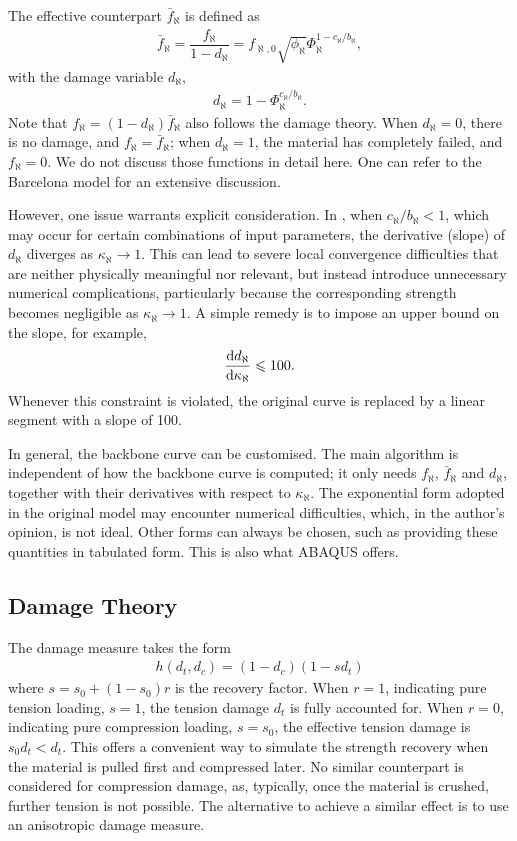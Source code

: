 The effective counterpart $\bar{f}_\aleph$ is defined as
\begin{gather*}
\bar{f}_\aleph=\dfrac{f_\aleph}{1-d_\aleph}=f_{\aleph,0}\sqrt{\phi_\aleph}\Phi_\aleph^{1-c_\aleph/b_\aleph},
\end{gather*}
with the damage variable $d_\aleph$,
\begin{gather}\label{eq:cdp_d_backbone}
d_\aleph=1-\Phi_\aleph^{c_\aleph/b_\aleph}.
\end{gather}
Note that $f_\aleph=\left(1-d_\aleph\right)\bar{f}_\aleph$ also follows the damage theory.
When $d_\aleph=0$, there is no damage, and $f_\aleph=\bar{f}_\aleph$; when $d_\aleph=1$, the material has completely failed, and $f_\aleph=0$.
We do not discuss those functions in detail here.
One can refer to the Barcelona model \cite{Lubliner1989} for an extensive discussion.

However, one issue warrants explicit consideration.
In , when $c_\aleph/b_\aleph<1$, which may occur for certain combinations of input parameters, the derivative (slope) of $d_\aleph$ diverges as $\kappa_\aleph\rightarrow1$.
This can lead to severe local convergence difficulties that are neither physically meaningful nor relevant, but instead introduce unnecessary numerical complications, particularly because the corresponding strength becomes negligible as $\kappa_\aleph\rightarrow1$.
A simple remedy is to impose an upper bound on the slope, for example,
\begin{gather}
    \dfrac{\mathrm{d}d_\aleph}{\mathrm{d}\kappa_\aleph}\leqslant100.
\end{gather}
Whenever this constraint is violated, the original curve is replaced by a linear segment with a slope of \num{100}.

In general, the backbone curve can be customised.
The main algorithm is independent of how the backbone curve is computed; it only needs $f_\aleph$, $\bar{f}_\aleph$ and $d_\aleph$, together with their derivatives with respect to $\kappa_\aleph$.
The exponential form adopted in the original model may encounter numerical difficulties, which, in the author's opinion, is not ideal.
Other forms can always be chosen, such as providing these quantities in tabulated form.
This is also what ABAQUS offers.
\subsection{Damage Theory}
The damage measure takes the form
\begin{gather}
h\left(d_t,d_c\right)=\left(1-d_c\right)\left(1-sd_t\right)
\end{gather}
where $s=s_0+\left(1-s_0\right)r$ is the recovery factor.
When $r=1$, indicating pure tension loading, $s=1$, the tension damage $d_t$ is fully accounted for.
When $r=0$, indicating pure compression loading, $s=s_0$, the effective tension damage is $s_0d_t<d_t$.
This offers a convenient way to simulate the strength recovery when the material is pulled first and compressed later.
No similar counterpart is considered for compression damage, as, typically, once the material is crushed, further tension is not possible.
The alternative to achieve a similar effect is to use an anisotropic damage measure.
